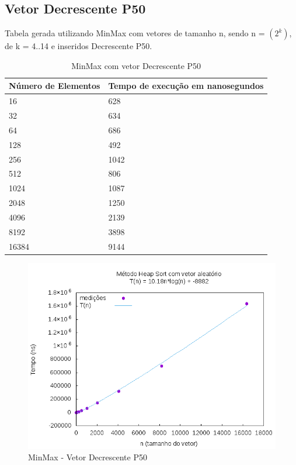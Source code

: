 \documentclass[12pt,a4paper,twoside]{report}
\begin{document}
\subsection{Vetor Decrescente P50}
Tabela gerada utilizando MinMax com vetores de tamanho n, sendo n = $(2^k)$, de k = 4..14 e inseridos Decrescente P50.
\begin{table}[H]
\centering
\caption{MinMax com vetor Decrescente P50}
\label{my-label}
\begin{tabular}{|l|l|}
\hline
\multicolumn{1}{|c|}{\textbf{Número de Elementos}} & \multicolumn{1}{c|}{\textbf{Tempo de execução em nanosegundos}} \\ \hline
16 & 628 \\ \hline
32 & 634 \\ \hline
64 & 686 \\ \hline
128 & 492 \\ \hline
256 & 1042 \\ \hline
512 & 806 \\ \hline
1024 & 1087 \\ \hline
2048 & 1250 \\ \hline
4096 & 2139 \\ \hline
8192 & 3898 \\ \hline
16384 & 9144 \\ \hline
\end{tabular}
\end{table}

\begin{figure}[H]
    \centering
    \includegraphics[width=0.7\linewidth]{graficos/HeapSort/vIntAleatorio/vIntAleatorio.png}
  \caption{MinMax - Vetor Decrescente P50}
\end{figure}

%
%
\end{document}
